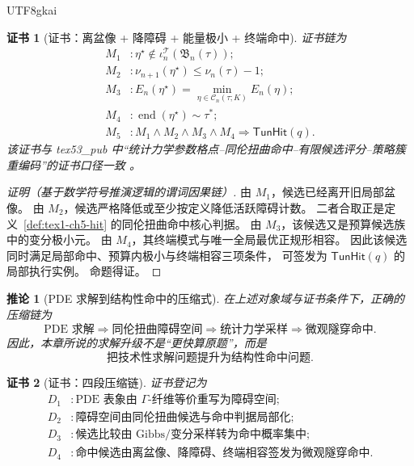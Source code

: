 \documentclass[12pt]{article}
\newtheorem{corollary}{推论}[section]
\newtheorem{Certificate}{证书}[section]
\begin{document}
\begin{CJK*}{UTF8}{gkai}
\begin{Certificate}[证书：离盆像 + 降障碍 + 能量极小 + 终端命中]
\label{cert:tex1-ch5-tunnel-hit-local}
证书链为
\[
\begin{aligned}
  M_1 &: \eta^\star\notin\iota_n^{\mathcal T}(\mathfrak B_n(\tau));\\
  M_2 &: \nu_{n+1}(\eta^\star)\le\nu_n(\tau)-1;\\
  M_3 &: E_n(\eta^\star)=\min_{\eta\in\mathcal C_n(\tau;K)}E_n(\eta);\\
  M_4 &: \operatorname{end}(\eta^\star)\sim\tau^\ast;\\
  M_5 &: M_1\wedge M_2\wedge M_3\wedge M_4
        \Rightarrow \mathsf{TunHit}(q).
\end{aligned}
\]
该证书与 tex53\_pub 中“统计力学参数格点--同伦扭曲命中--有限候选评分--策略簇重编码”的证书口径一致
\cite{RepoTex53PDEStrategyCluster}。
\end{Certificate}

\begin{proof}[证明（基于数学符号推演逻辑的谓词因果链）]
由 \(M_1\)，候选已经离开旧局部盆像。
由 \(M_2\)，候选严格降低或至少按定义降低活跃障碍计数。
二者合取正是定义~\ref{def:tex1-ch5-hit} 的同伦扭曲命中核心判据。
由 \(M_3\)，该候选又是预算候选族中的变分极小元。
由 \(M_4\)，其终端模式与唯一全局最优正规形相容。
因此该候选同时满足局部命中、预算内极小与终端相容三项条件，
可签发为 \(\mathsf{TunHit}(q)\) 的局部执行实例。
命题得证。
\end{proof}

\begin{corollary}[PDE 求解到结构性命中的压缩式]
\label{cor:tex1-ch5-pde-to-hit}
在上述对象域与证书条件下，正确的压缩链为
\[
  \boxed{
  \text{PDE 求解}
  \Longrightarrow
  \text{同伦扭曲障碍空间}
  \Longrightarrow
  \text{统计力学采样}
  \Longrightarrow
  \text{微观隧穿命中}.}
\]
因此，本章所说的求解升级不是“更快算原题”，而是
\[
  \boxed{
  \text{把技术性求解问题提升为结构性命中问题}.}
\]
\end{corollary}

\begin{Certificate}[证书：四段压缩链]
\label{cert:tex1-ch5-pde-to-hit-cor}
证书登记为
\[
\begin{aligned}
  D_1 &: \text{PDE 表象由 \(\Gamma\)-纤维等价重写为障碍空间};\\
  D_2 &: \text{障碍空间由同伦扭曲候选与命中判据局部化};\\
  D_3 &: \text{候选比较由 Gibbs/变分采样转为命中概率集中};\\
  D_4 &: \text{命中候选由离盆像、降障碍、终端相容签发为微观隧穿命中}.
\end{aligned}
\]
\end{Certificate}


\end{CJK*}
\end{document}
